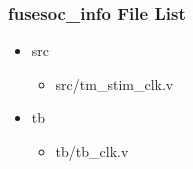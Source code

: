 \subsubsection{fusesoc\_info File List}
\begin{itemize}
\item src
	\begin{itemize}
	\item src/tm\_stim\_clk.v
	\end{itemize}
\item tb
	\begin{itemize}
	\item tb/tb\_clk.v
	\end{itemize}
\end{itemize}
